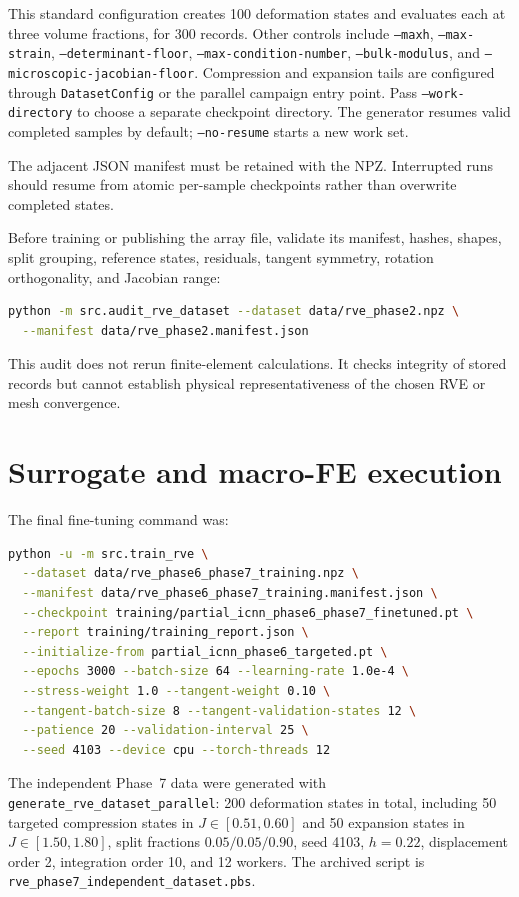 This standard configuration creates 100 deformation states and evaluates
each at three volume fractions, for 300 records. Other controls include
\texttt{--maxh}, \texttt{--max-strain},
\texttt{--determinant-floor}, \texttt{--max-condition-number},
\texttt{--bulk-modulus}, and \texttt{--microscopic-jacobian-floor}.
Compression and expansion tails are configured through
\texttt{DatasetConfig} or the parallel campaign entry point. Pass
\texttt{--work-directory} to choose a separate checkpoint directory. The
generator resumes valid completed samples by default;
\texttt{--no-resume} starts a new work set.

The adjacent JSON manifest must be retained with the NPZ. Interrupted runs
should resume from atomic per-sample checkpoints rather than overwrite
completed states.

Before training or publishing the array file, validate its manifest, hashes,
shapes, split grouping, reference states, residuals, tangent symmetry,
rotation orthogonality, and Jacobian range:
\begin{lstlisting}[language=bash]
python -m src.audit_rve_dataset --dataset data/rve_phase2.npz \
  --manifest data/rve_phase2.manifest.json
\end{lstlisting}
This audit does not rerun finite-element calculations. It checks integrity
of stored records but cannot establish physical representativeness of the
chosen RVE or mesh convergence.

\section{Surrogate and macro-FE execution}

The final fine-tuning command was:
\begin{lstlisting}[language=bash]
python -u -m src.train_rve \
  --dataset data/rve_phase6_phase7_training.npz \
  --manifest data/rve_phase6_phase7_training.manifest.json \
  --checkpoint training/partial_icnn_phase6_phase7_finetuned.pt \
  --report training/training_report.json \
  --initialize-from partial_icnn_phase6_targeted.pt \
  --epochs 3000 --batch-size 64 --learning-rate 1.0e-4 \
  --stress-weight 1.0 --tangent-weight 0.10 \
  --tangent-batch-size 8 --tangent-validation-states 12 \
  --patience 20 --validation-interval 25 \
  --seed 4103 --device cpu --torch-threads 12
\end{lstlisting}

The independent Phase~7 data were generated with
\texttt{generate\_rve\_dataset\_parallel}: 200 deformation states in total,
including 50 targeted compression states in \(J\in[0.51,0.60]\) and 50
expansion states in \(J\in[1.50,1.80]\), split fractions
\(0.05/0.05/0.90\), seed 4103, \(h=0.22\), displacement order 2,
integration order 10, and 12 workers. The archived script is
\texttt{rve\_phase7\_independent\_dataset.pbs}.

